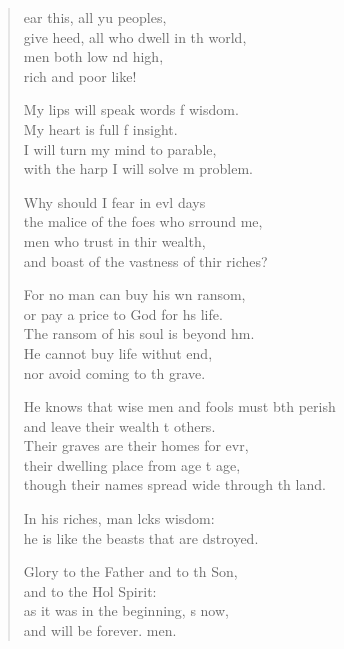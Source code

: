 \begin{verse}
  \begin{patverse}
ear this, all yu peoples,\Med\\
give heed, all who dwell in th world,\\
men both low nd high,\Med\\
rich and poor like!

My lips will speak words f wisdom.\Med\\
My heart is full f insight.\\
I will turn my mind to  parable,\Med\\
with the harp I will solve m problem.

Why should I fear in ev\pointup{\i}l days\Med\\
the malice of the foes who srround me,\\
men who trust in thir wealth,\Med\\
and boast of the vastness of thir riches?

For no man can buy his wn ransom,\Med\\
or pay a price to God for h\pointup{\i}s life.\\
The ransom of his soul is beyond h\pointup{\i}m.\Flex\\
He cannot buy life withut end,\Med\\
nor avoid coming to th grave.

He knows that wise men and fools must bth perish\Med\\
and leave their wealth t others.\\
Their graves are their homes for evr,\Flex\\
their dwelling place from age t age,\Med\\
though their names spread wide through th land.

In his riches, man lcks wisdom:\Med\\
he is like the beasts that are dstroyed.

Glory to the Father and to th Son,\Med\\
and to the Hol Spirit:\\
as it was in the beginning, \pointup{\i}s now,\Med\\
and will be forever. men. 
  \end{patverse}
\end{verse}
